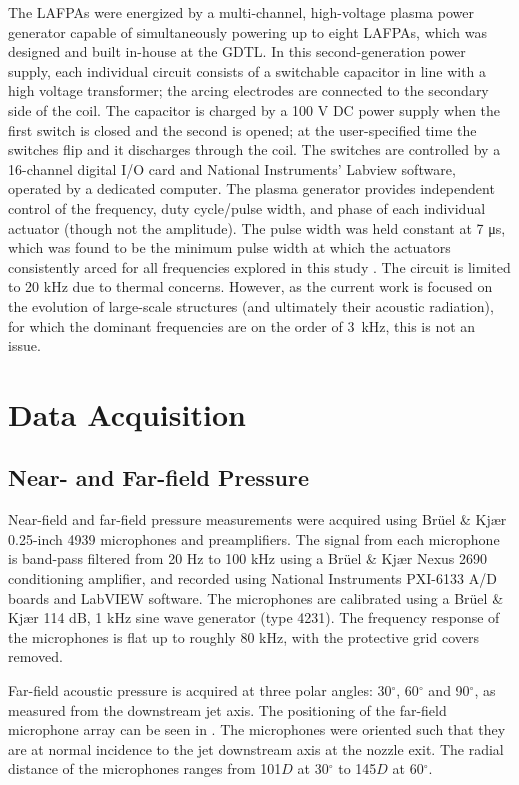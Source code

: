 The LAFPAs were energized by a multi-channel, high-voltage plasma power generator capable of simultaneously powering up to eight LAFPAs, which was designed and built in-house at the GDTL. 
In this second-generation power supply, each individual circuit consists of a switchable capacitor in line with a high voltage transformer; the arcing electrodes are connected to the secondary side of the coil. 
The capacitor is charged by a 100 V DC power supply when the first switch is closed and the second is opened; at the user-specified time the switches flip and it discharges through the coil. 
The switches are controlled by a 16-channel digital I/O card and National Instruments' Labview software, operated by a dedicated computer. The plasma generator provides independent control of the frequency, duty cycle/pulse width, and phase of each individual actuator (though not the amplitude). 
The pulse width was held constant at 7 μs, which was found to be the minimum pulse width at which the actuators consistently arced for all frequencies explored in this study \citep{Hahn2011a}. 
The circuit is limited to 20 kHz due to thermal concerns.
However, as the current work is focused on the evolution of large-scale structures (and ultimately their acoustic radiation), for which the dominant frequencies are on the order of 3~kHz, this is not an issue.

\section{Data Acquisition}
\subsection{Near- and Far-field Pressure}
\label{sect:NF_methodology}
Near-field and far-field pressure measurements were acquired using Br\"{u}el \& Kj\ae{}r 0.25-inch 4939 microphones and preamplifiers. 
The signal from each microphone is band-pass filtered from 20 Hz to 100 kHz using a Br\"{u}el \& Kj\ae{}r Nexus 2690 conditioning amplifier, and recorded using National Instruments PXI-6133 A/D boards and LabVIEW software. 
The microphones are calibrated using a Br\"{u}el \& Kj\ae{}r 114 dB, 1 kHz sine wave generator (type 4231). 
The frequency response of the microphones is flat up to roughly 80 kHz, with the protective grid covers removed. 

Far-field acoustic pressure is acquired at three polar angles: 30$^\circ$, 60$^\circ$ and 90$^\circ$, as measured from the downstream jet axis. 
The positioning of the far-field microphone array can be seen in .
The microphones were oriented such that they are at normal incidence to the jet downstream axis at the nozzle exit. 
The radial distance of the microphones ranges from 101$D$ at 30$^\circ$ to 145$D$ at 60$^\circ$. 

